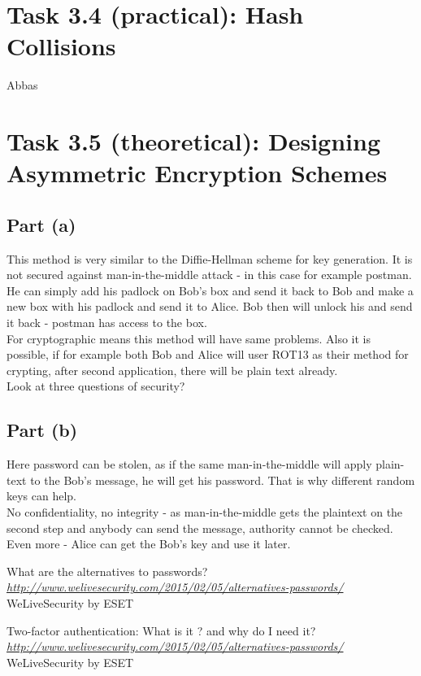 \documentclass{article}
\begin{document}
\section*{Task 3.4 (practical): Hash Collisions}
Abbas

\section*{Task 3.5 (theoretical): Designing Asymmetric Encryption Schemes}
\subsection*{Part (a)}
This method is very similar to the Diffie-Hellman scheme for key generation. It is not secured against man-in-the-middle attack - in this case for example postman. He can simply add his padlock on Bob's box and send it back to Bob and make a new box with his padlock and send it to Alice. Bob then will unlock his and send it back - postman has access to the box. 
\\
For cryptographic means this method will have same problems. Also it is possible, if for example both Bob and Alice will user ROT13 as their method for crypting, after second application, there will be plain text already.
\\
Look at three questions of security?

\subsection*{Part (b)}
Here password can be stolen, as if the same man-in-the-middle will apply plain-text to the Bob's message, he will get his password. That is why different random keys can help.
\\
No confidentiality, no integrity - as man-in-the-middle gets the plaintext on the second step and anybody can send the message, authority cannot be checked. Even more - Alice can get the Bob's key and use it later.


\begin{thebibliography}{9}

  What are the alternatives to passwords?
  \emph{\url{http://www.welivesecurity.com/2015/02/05/alternatives-passwords/}}
  WeLiveSecurity by ESET
  
  Two-factor authentication: What is it ? and why do I need it?
  \emph{\url{http://www.welivesecurity.com/2015/02/05/alternatives-passwords/}}
  WeLiveSecurity by ESET

\end{thebibliography}
\end{document}
